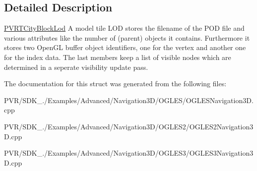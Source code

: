 \subsection{Detailed Description}


  \hyperlink{struct_p_v_r_t_city_block_lod}{P\+V\+R\+T\+City\+Block\+Lod}  A model tile L\+O\+D stores the filename of the P\+O\+D file and various attributes like the number of (parent) objects it contains. Furthermore it stores two Open\+G\+L buffer object identifiers, one for the vertex and another one for the index data. The last members keep a list of visible nodes which are determined in a seperate visibility update pass. 

The documentation for this struct was generated from the following files\+:\begin{DoxyCompactItemize}
\item 
P\+V\+R/\+S\+D\+K\+\_./\+Examples/\+Advanced/\+Navigation3\+D/\+O\+G\+L\+E\+S/O\+G\+L\+E\+S\+Navigation3\+D.\+cpp\item 
P\+V\+R/\+S\+D\+K\+\_./\+Examples/\+Advanced/\+Navigation3\+D/\+O\+G\+L\+E\+S2/O\+G\+L\+E\+S2\+Navigation3\+D.\+cpp\item 
P\+V\+R/\+S\+D\+K\+\_./\+Examples/\+Advanced/\+Navigation3\+D/\+O\+G\+L\+E\+S3/O\+G\+L\+E\+S3\+Navigation3\+D.\+cpp\end{DoxyCompactItemize}
